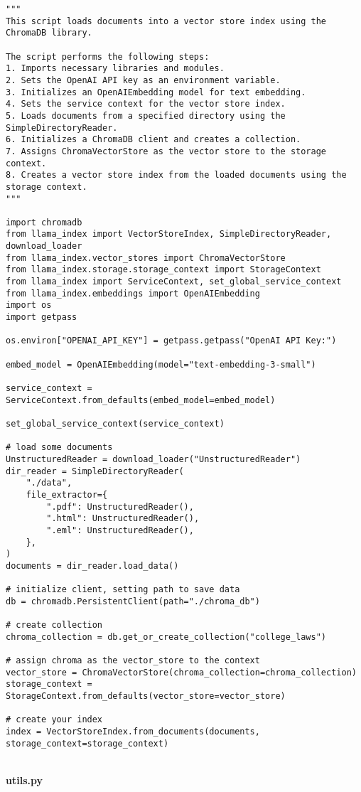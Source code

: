 \begin{Verbatim}[breaklines=true, breakanywhere=true]
"""
This script loads documents into a vector store index using the ChromaDB library.

The script performs the following steps:
1. Imports necessary libraries and modules.
2. Sets the OpenAI API key as an environment variable.
3. Initializes an OpenAIEmbedding model for text embedding.
4. Sets the service context for the vector store index.
5. Loads documents from a specified directory using the SimpleDirectoryReader.
6. Initializes a ChromaDB client and creates a collection.
7. Assigns ChromaVectorStore as the vector store to the storage context.
8. Creates a vector store index from the loaded documents using the storage context.
"""

import chromadb
from llama_index import VectorStoreIndex, SimpleDirectoryReader, download_loader
from llama_index.vector_stores import ChromaVectorStore
from llama_index.storage.storage_context import StorageContext
from llama_index import ServiceContext, set_global_service_context
from llama_index.embeddings import OpenAIEmbedding
import os
import getpass

os.environ["OPENAI_API_KEY"] = getpass.getpass("OpenAI API Key:")

embed_model = OpenAIEmbedding(model="text-embedding-3-small")

service_context = ServiceContext.from_defaults(embed_model=embed_model)

set_global_service_context(service_context)

# load some documents
UnstructuredReader = download_loader("UnstructuredReader")
dir_reader = SimpleDirectoryReader(
    "./data",
    file_extractor={
        ".pdf": UnstructuredReader(),
        ".html": UnstructuredReader(),
        ".eml": UnstructuredReader(),
    },
)
documents = dir_reader.load_data()

# initialize client, setting path to save data
db = chromadb.PersistentClient(path="./chroma_db")

# create collection
chroma_collection = db.get_or_create_collection("college_laws")

# assign chroma as the vector_store to the context
vector_store = ChromaVectorStore(chroma_collection=chroma_collection)
storage_context = StorageContext.from_defaults(vector_store=vector_store)

# create your index
index = VectorStoreIndex.from_documents(documents, storage_context=storage_context)
\end{Verbatim}
\
\\
\textbf{utils.py}

